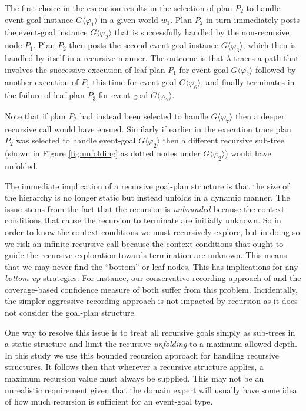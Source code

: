 The first choice in the execution results in the selection of plan $P_2$ to handle event-goal instance $G\langle\varphi_1\rangle$ in a given world $w_1$. Plan $P_2$ in turn immediately posts the event-goal instance $G\langle\varphi_2\rangle$ that is successfully handled by the non-recursive node $P_1$. Plan $P_2$ then posts the second event-goal instance $G\langle\varphi_3\rangle$, which then is handled by itself in a recursive manner.  The outcome is that $\lambda$ traces a path that involves the successive execution of leaf plan $P_1$ for event-goal $G\langle\varphi_2\rangle$ followed by another execution of $P_1$ this time for event-goal $G\langle\varphi_6\rangle$, and finally terminates in the failure of leaf plan $P_3$ for event-goal $G\langle\varphi_7\rangle$. 

Note that if plan $P_2$ had instead been selected to handle $G\langle\varphi_7\rangle$ then a deeper recursive call would have ensued. Similarly if earlier in the execution trace plan $P_2$ was selected to handle event-goal $G\langle\varphi_2\rangle$ then a different recursive sub-tree (shown in Figure \ref{fig:unfolding} as dotted nodes under $G\langle\varphi_2\rangle$) would have unfolded.

The immediate implication of a recursive goal-plan structure is that the size of the hierarchy is no longer static but instead unfolds in a dynamic manner. The issue stems from the fact that the recursion is \textit{unbounded} because the context conditions that cause the recursion to terminate are initially unknown. So in order to know the context conditions we must recursively explore, but in doing so we risk an infinite recursive call because the context conditions that ought to guide the recursive exploration towards termination are unknown. This means that we may never find the ``bottom'' or leaf nodes. This has implications for any \textit{bottom-up} strategies. For instance, our conservative recording approach of \cite{Airiau:IJAT:09} and the coverage-based confidence measure of \cite{Singh:AAMAS10} both suffer from this problem. Incidentally, the simpler aggressive recording approach is not impacted by recursion as it does not consider the goal-plan structure.

One way to resolve this issue is to treat all recursive goals simply as sub-trees in a static structure and limit the recursive \textit{unfolding}  to a maximum allowed depth. In this study we use this bounded recursion approach for handling recursive structures. It follows then that wherever a recursive structure applies, a maximum recursion value must always be supplied. This may not be an unrealistic requirement given that the domain expert will usually have some idea of how much recursion is sufficient for an event-goal type.


